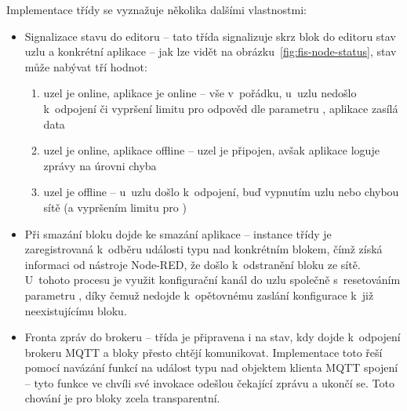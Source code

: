 Implementace třídy  se vyznažuje několika dalšími vlastnostmi:
\begin{itemize}
    \item Signalizace stavu do editoru -- tato třída signalizuje skrz blok do editoru stav uzlu a konkrétní
    aplikace -- jak lze vidět na obrázku~\ref{fig:fis-node-status}, stav může nabývat tří hodnot:
    \begin{enumerate}
        \item uzel je online, aplikace je online -- vše v~pořádku, u~uzlu nedošlo k~odpojení či vypršení limitu pro
        odpověd dle parametru , aplikace zasílá data
        \item uzel je online, aplikace offline -- uzel je připojen, avšak aplikace loguje zprávy na úrovni chyba
        \item uzel je offline -- u~uzlu došlo k~odpojení, buď vypnutím uzlu nebo chybou sítě (a vypršením limitu pro
        )
    \end{enumerate}
    \item Při smazání bloku dojde ke smazání aplikace -- instance třídy  je zaregistrovaná k~odběru
    události typu  nad konkrétním blokem, čímž získá informaci od nástroje Node-RED, že došlo
k~odstranění bloku ze sítě.
    U~tohoto procesu je využit konfigurační kanál do uzlu společně s~resetováním parametru , díky čemuž
    nedojde k~opětovnému zaslání konfigurace k~již neexistujícímu bloku.
    \item Fronta zpráv do brokeru -- třída je připravena i na stav, kdy dojde k~odpojení brokeru MQTT a bloky
    přesto chtějí komunikovat.
    Implementace toto řeší pomocí navázání funkcí na událost typu  nad
    objektem klienta MQTT spojení -- tyto funkce ve chvíli své invokace odešlou čekající zprávu a ukončí se.
    Toto chování je pro bloky zcela transparentní.
\end{itemize}

